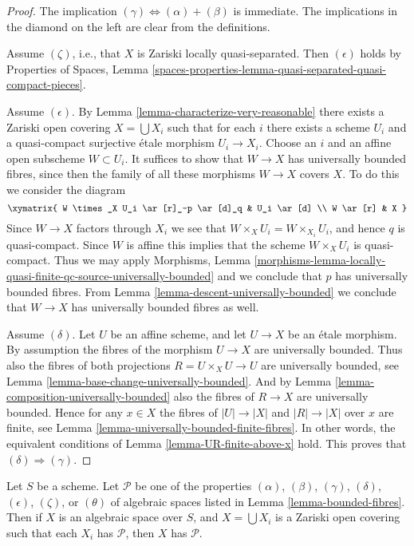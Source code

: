 \begin{proof}
The implication $(\gamma) \Leftrightarrow (\alpha) + (\beta)$ is immediate.
The implications in the diamond on the left are clear from the
definitions.

\medskip\noindent
Assume $(\zeta)$, i.e., that $X$ is Zariski locally quasi-separated.
Then $(\epsilon)$ holds by
Properties of Spaces, Lemma
\ref{spaces-properties-lemma-quasi-separated-quasi-compact-pieces}.

\medskip\noindent
Assume $(\epsilon)$. By
Lemma \ref{lemma-characterize-very-reasonable}
there exists
a Zariski open covering $X = \bigcup X_i$ such that for each $i$
there exists a scheme $U_i$ and a quasi-compact surjective \'etale morphism
$U_i \to X_i$. Choose an $i$ and an affine open subscheme $W \subset U_i$.
It suffices to show that $W \to X$ has universally bounded fibres, since then
the family of all these morphisms $W \to X$ covers $X$.
To do this we consider the diagram
$$
\xymatrix{
W \times_X U_i \ar[r]_-p \ar[d]_q & U_i \ar[d] \\
W \ar[r] & X
}
$$
Since $W \to X$ factors through $X_i$ we see that
$W \times_X U_i = W \times_{X_i} U_i$, and hence $q$ is quasi-compact.
Since $W$ is affine this implies that the scheme $W \times_X U_i$
is quasi-compact. Thus we may apply
Morphisms, Lemma
\ref{morphisms-lemma-locally-quasi-finite-qc-source-universally-bounded}
and we conclude that $p$ has universally bounded fibres. From
Lemma \ref{lemma-descent-universally-bounded}
we conclude that $W \to X$ has universally bounded fibres as well.

\medskip\noindent
Assume $(\delta)$. Let $U$ be an affine scheme, and let $U \to X$ be an \'etale
morphism. By assumption the fibres of the morphism $U \to X$ are universally
bounded. Thus also the fibres of both projections $R = U \times_X U \to U$
are universally bounded, see
Lemma \ref{lemma-base-change-universally-bounded}.
And by
Lemma \ref{lemma-composition-universally-bounded}
also the fibres of $R \to X$ are universally bounded.
Hence for any $x \in X$ the fibres of $|U| \to |X|$ and $|R| \to |X|$
over $x$ are finite, see
Lemma \ref{lemma-universally-bounded-finite-fibres}.
In other words, the equivalent conditions of
Lemma \ref{lemma-UR-finite-above-x}
hold. This proves that $(\delta) \Rightarrow (\gamma)$.
\end{proof}

\begin{lemma}
\label{lemma-properties-local}
Let $S$ be a scheme.
Let $\mathcal{P}$ be one of the properties
$(\alpha)$, $(\beta)$, $(\gamma)$, $(\delta)$, $(\epsilon)$, $(\zeta)$, or
$(\theta)$ of algebraic spaces listed in
Lemma \ref{lemma-bounded-fibres}.
Then if $X$ is an algebraic space over $S$, and $X = \bigcup X_i$ is a
Zariski open covering such that each $X_i$ has $\mathcal{P}$,
then $X$ has $\mathcal{P}$.
\end{lemma}

